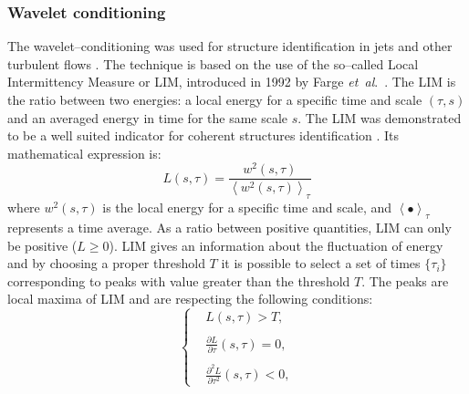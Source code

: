\documentclass[english]{aiaa-tc}
\newcommand*{\etal}{\textit{et~al}.\ }
\begin{document}
\subsubsection{Wavelet conditioning}
The wavelet--conditioning was used for structure identification in jets and other turbulent flows \cite{Camussi1997,Camussi1997b,Guj1999,Camussi2002,Guj2003}.
The technique is based on the use of the so--called Local Intermittency Measure or LIM, introduced in 1992 by Farge \etal \cite{Farge1992}.
The LIM is the ratio between two energies: a local energy for a specific time and scale $(\tau, s)$ and an averaged energy in time for the same scale $s$.
The LIM was demonstrated to be a well suited indicator for coherent structures identification \cite{Camussi1997}. Its mathematical expression is:
\begin{equation}
	\label{eqn:LIM}
	L(s, \tau) = \frac{w^{2}(s, \tau)}{\left<w^{2}(s, \tau)\right>_{\tau}}
\end{equation}
where $w^{2}(s, \tau)$ is the local energy for a specific time and scale, and $\left< \bullet \right>_{\tau}$ represents a time average.
As a ratio between positive quantities, LIM can only be positive ($L \geqslant 0 $). LIM gives an information about the fluctuation of energy and by choosing a proper threshold $T$ it is possible to select a set of times $\{\tau_{i}\}$ corresponding to peaks with value greater than the threshold $T$.
The peaks are local maxima of LIM and are respecting the following conditions:
\begin{equation} \label{eqn:thresholdLIM}
    \begin{cases}
        &L(s, \tau) > T,\\
        \\
        &\frac{\partial L}{\partial \tau}(s, \tau) = 0,\\
        \\
        &\frac{\partial^{2} L}{\partial \tau^{2}}(s, \tau) < 0,
    \end{cases}
\end{equation}

\end{document}
